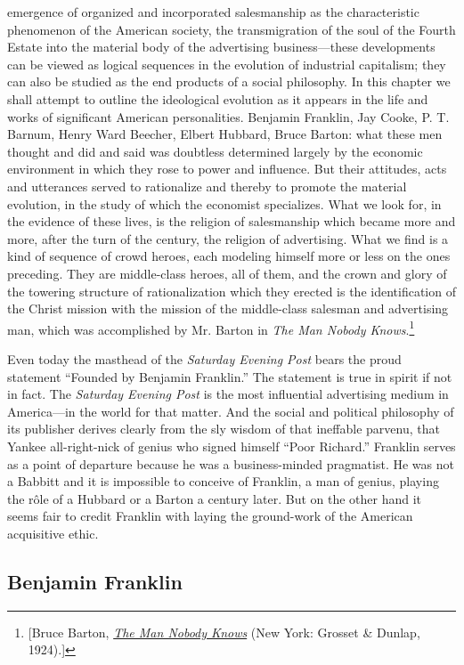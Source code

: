 \documentclass[twoside,nohyper,openany,nobib]{tufte-book}
\begin{document}
 emergence of organized and incorporated salesmanship as the
characteristic phenomenon of the American society, the transmigration of
the soul of the Fourth Estate into the material body of the advertising
business---these developments can be viewed as logical sequences in the
evolution of industrial capitalism; they can also be studied as the end
products of a social philosophy. In this chapter we shall attempt to
outline the ideological evolution as it appears in the life and works of
significant American personalities. Benjamin Franklin, Jay Cooke, P. T.
Barnum, Henry Ward Beecher, Elbert Hubbard, Bruce Barton: what these men
thought and did and said was doubtless determined largely by the
economic environment in which they rose to power and influence. But
their attitudes, acts and utterances served to rationalize and thereby
to promote the material evolution, in the study of which the economist
specializes. What we look for, in the evidence of these lives, is the
religion of salesmanship which became more and more, after the turn of
the century, the religion of advertising. What we find is a kind of
sequence of crowd heroes, each modeling himself more or less on the ones
preceding. They are middle-class heroes, all of them, and the crown and
glory of the towering structure of rationalization which they erected is
the identification of the Christ mission with the mission of the
middle-class salesman and advertising man, which was accomplished by Mr.
Barton in \emph{The Man Nobody Knows}.\footnote{{[}Bruce Barton,
  \emph{\href{http://www.worldcat.org/oclc/70421692}{The Man Nobody
  Knows}} (New York: Grosset \& Dunlap, 1924).{]}}

Even today the masthead of the \emph{Saturday Evening Post} bears the
proud statement ``Founded by Benjamin Franklin.'' The statement is true
in spirit if not in fact. The \emph{Saturday Evening Post} is the most
influential advertising medium in America---in the world for that
matter. And the social and political philosophy of its publisher derives
clearly from the sly wisdom of that ineffable parvenu, that Yankee
all-right-nick of genius who signed himself ``Poor Richard.'' Franklin
serves as a point of departure because he was a business-minded
pragmatist. He was not a Babbitt and it is impossible to conceive of
Franklin, a man of genius, playing the r\^ole of a Hubbard or a Barton a
century later. But on the other hand it seems fair to credit Franklin
with laying the ground-work of the American acquisitive ethic.

\subsection{Benjamin Franklin}
\end{document}
